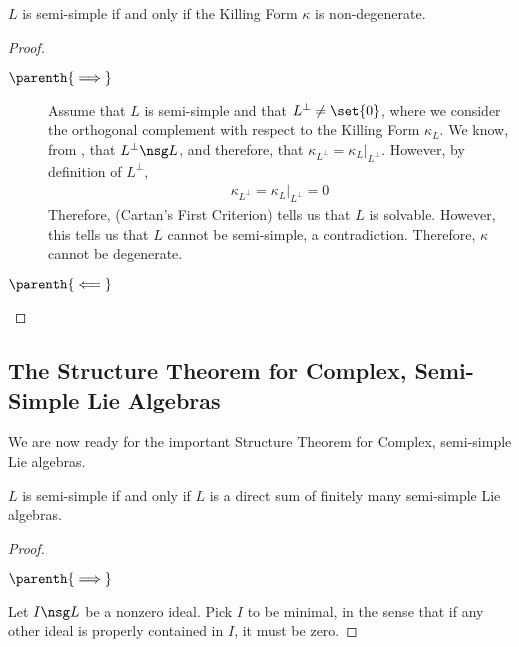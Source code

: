 \begin{boxtheorem}\label{SP:Thm:CartanII}
    $L$ is semi-simple if and only if the Killing Form $\kappa$ is non-degenerate.
\end{boxtheorem}
\begin{proof}
    \begin{description}
        \item[$\parenth{\implies}$]
        Assume that $L$ is semi-simple and that $L^\perp \neq \set{0}$, where we consider the orthogonal complement with respect to the Killing Form $\kappa_L$. We know, from , that $L^\perp \nsg L$, and therefore, that $\kappa_{L^\perp} = \kappa_L\vert_{L^\perp}$. However, by definition of $L^\perp$,
        \begin{align*}
            \kappa_{L^\perp} = \kappa_L\vert_{L^\perp} = 0
        \end{align*}
        Therefore,  (Cartan's First Criterion) tells us that $L$ is solvable. However, this tells us that $L$ cannot be semi-simple, a contradiction. Therefore, $\kappa$ cannot be degenerate.
        
        \item[$\parenth{\impliedby}$] \sorry %
    \end{description}
\end{proof}

\subsection{The Structure Theorem for Complex, Semi-Simple Lie Algebras}

We are now ready for the important Structure Theorem for Complex, semi-simple Lie algebras.

\begin{boxtheorem}\label{SP:Thm:Structure}
    $L$ is semi-simple if and only if $L$ is a direct sum of finitely many semi-simple Lie algebras.
\end{boxtheorem}

\begin{proof}
    \begin{description}
        \item[$\parenth{\implies}$] 
    \end{description}
    Let $I \nsg L$ be a nonzero ideal. Pick $I$ to be minimal, in the sense that if any other ideal is properly contained in $I$, it must be zero.
    \sorry %

\end{proof}